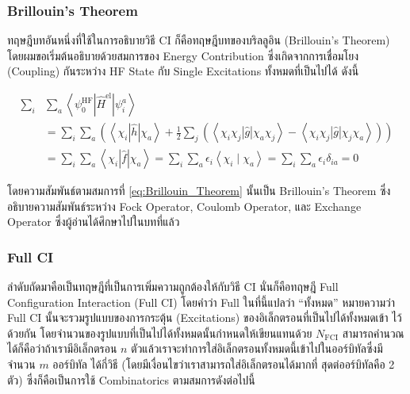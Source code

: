 \subsubsection{Brillouin's Theorem}

ทฤษฎีบทอันหนึ่งที่ใช้ในการอธิบายวิธี CI ก็คือทฤษฎีบทของบริลลูอิน (Brillouin's Theorem) โดยผมขอเริ่มต้นอธิบายด้วยสมการของ Energy
Contribution ซึ่งเกิดจากการเชื่อมโยง (Coupling) กันระหว่าง HF State กับ Single Excitations ทั้งหมดที่เป็นไปได้ ดังนี้

\begin{equation}
  \label{eq:Brillouin_Theorem}
  \begin{aligned}
    \sum_i & \sum_a
    \left\langle\psi_0^{\mathrm{HF}}
    \left| \hat{H}^{\mathrm{el}} \right|
    \psi_i^a\right\rangle                                                         \\
           & = \sum_i \sum_a\left(\left\langle\chi_i|\hat{h}| \chi_a\right\rangle
    + \frac{1}{2} \sum_j\left(\left\langle\chi_i \chi_j|\hat{g}| \chi_a \chi_j\right\rangle
    - \left\langle\chi_i \chi_j|\hat{g}| \chi_j \chi_a\right\rangle\right)\right) \\
           & = \sum_i \sum_a\left\langle\chi_i|\hat{f}| \chi_a\right\rangle
    = \sum_i \sum_a \epsilon_i\left\langle\chi_i \mid \chi_a\right\rangle
    = \sum_i \sum_a \epsilon_i \delta_{i a}
    = 0
  \end{aligned}
\end{equation}

\noindent โดยความสัมพันธ์ตามสมการที่ \eqref{eq:Brillouin_Theorem} นั้นเป็น Brillouin's Theorem ซึ่งอธิบายความสัมพันธ์ระหว่าง
Fock Operator, Coulomb Operator, และ Exchange Operator ซึ่งผู้อ่านได้ศึกษาไปในบทที่แล้ว

\subsubsection{Full CI}

ลำดับถัดมาคือเป็นทฤษฎีที่เป็นการเพิ่มความถูกต้องให้กับวิธี CI นั่นก็คือทฤษฎี Full Configuration Interaction (Full CI) โดยคำว่า Full
ในที่นี้แปลว่า \enquote{ทั้งหมด} หมายความว่า Full CI นั้นจะรวมรูปแบบของการกระตุ้น (Excitations) ของอิเล็กตรอนที่เป็นไปได้ทั้งหมดเข้า%
ไว้ด้วยกัน โดยจำนวนของรูปแบบที่เป็นไปได้ทั้งหมดนั้นกำหนดให้เขียนแทนด้วย $N_{\mathrm{FCI}}$ สามารถคำนวณได้ก็คือว่าถ้าเรามีอิเล็กตรอน
$n$ ตัวแล้วเราจะทำการใส่อิเล็กตรอนทั้งหมดนี้เข้าไปในออร์บิทัลซึ่งมีจำนวน $m$ ออร์บิทัล ได้กี่วิธี (โดยมีเงื่อนไขว่าเราสามารถใส่อิเล็กตรอนได้มากที่%
สุดต่ออร์บิทัลคือ 2 ตัว) ซึ่งก็คือเป็นการใช้ Combinatorics ตามสมการดังต่อไปนี้


